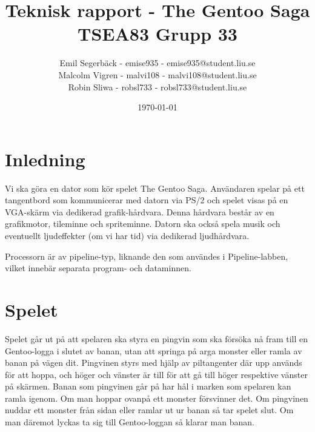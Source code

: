 \documentclass[a4paper,titlepage]{article}
\title{
\textbf{Teknisk rapport - The Gentoo Saga} \\
\large TSEA83 Grupp 33}
\date{\today}
\author{
        Emil Segerbäck - emise935 - emise935@student.liu.se\\
		Malcolm Vigren - malvi108 - malvi108@student.liu.se \\
		Robin Sliwa - robsl733 - robsl733@student.liu.se}
\begin{document}
    \maketitle
    \newpage
\tableofcontents
    \newpage

\section{Inledning}
Vi ska göra en dator som kör spelet The Gentoo Saga. Användaren spelar på ett
tangentbord som kommunicerar med datorn via PS/2 och spelet visas på en
VGA-skärm via dedikerad grafik-hårdvara. Denna hårdvara består av en
grafikmotor, tileminne och spriteminne. Datorn ska också spela musik och
eventuellt ljudeffekter (om vi har tid) via dedikerad ljudhårdvara.


Processorn är av pipeline-typ, liknande den som användes i
Pipeline-labben, vilket innebär separata program- och dataminnen. 

\section{Spelet}
Spelet går ut på att spelaren ska styra en pingvin som ska försöka nå fram till
en Gentoo-logga i slutet av banan, utan att springa på arga monster eller ramla
av banan på vägen dit. Pingvinen styrs med hjälp av piltangenter där upp används
för att hoppa, och höger och vänster är till för att gå till höger respektive
vänster på skärmen. Banan som pingvinen går på har hål i marken som spelaren kan
ramla igenom. Om man hoppar ovanpå ett monster försvinner det. Om pingvinen
nuddar ett monster från sidan eller ramlar ut ur banan så tar spelet slut. Om
man däremot lyckas ta sig till Gentoo-loggan så klarar man banan.

\end{document}
